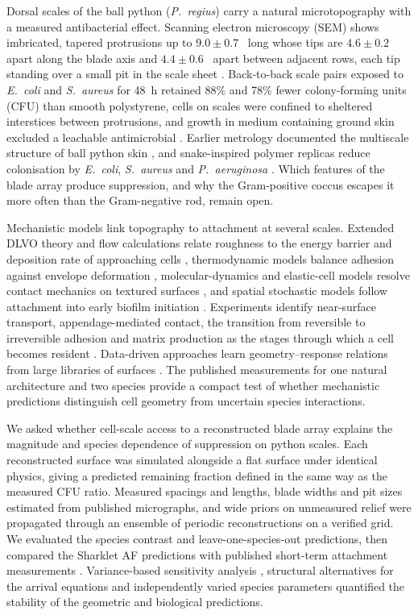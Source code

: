 \documentclass[11pt]{article}
\newcommand{\Ec}{\textit{E.~coli}}
\newcommand{\Sa}{\textit{S.~aureus}}
\newcommand{\Pa}{\textit{P.~aeruginosa}}
\newcommand{\Preg}{\textit{P.~regius}}
\begin{document}
Dorsal scales of the ball python (\Preg{}) carry a natural microtopography with a measured antibacterial effect. Scanning electron microscopy (SEM) shows imbricated, tapered protrusions up to $9.0\pm0.7$~\si{\micrometre} long whose tips are $4.6\pm0.2$~\si{\micrometre} apart along the blade axis and $4.4\pm0.6$~\si{\micrometre} apart between adjacent rows, each tip standing over a small pit in the scale sheet \cite{Peroutka2026}. Back-to-back scale pairs exposed to \Ec{} and \Sa{} for 48~h retained 88\% and 78\% fewer colony-forming units (CFU) than smooth polystyrene, cells on scales were confined to sheltered interstices between protrusions, and growth in medium containing ground skin excluded a leachable antimicrobial \cite{Peroutka2026}. Earlier metrology documented the multiscale structure of ball python skin \cite{AbdelAal2010}, and snake-inspired polymer replicas reduce colonisation by \Ec{}, \Sa{} and \Pa{} \cite{Sulochana2022}. Which features of the blade array produce suppression, and why the Gram-positive coccus escapes it more often than the Gram-negative rod, remain open.

Mechanistic models link topography to attachment at several scales. Extended DLVO theory and flow calculations relate roughness to the energy barrier and deposition rate of approaching cells \cite{Ammar2015,Hermansson1999,Bos1999}, thermodynamic models balance adhesion against envelope deformation \cite{Li2016}, molecular-dynamics and elastic-cell models resolve contact mechanics on textured surfaces \cite{Lazzini2021,Bellanato2026}, and spatial stochastic models follow attachment into early biofilm initiation \cite{Chathoth2022}. Experiments identify near-surface transport, appendage-mediated contact, the transition from reversible to irreversible adhesion and matrix production as the stages through which a cell becomes resident \cite{Zheng2021,An1998,Berne2018,Hoffman2015,Carniello2018,Dufrene2020,Jenal2017,Flemming2016,DiMartino2018,Hou2018}. Data-driven approaches learn geometry--response relations from large libraries of surfaces \cite{Tang2024,Romero2025,LeFevre2025}. The published measurements for one natural architecture and two species provide a compact test of whether mechanistic predictions distinguish cell geometry from uncertain species interactions.

We asked whether cell-scale access to a reconstructed blade array explains the magnitude and species dependence of suppression on python scales. Each reconstructed surface was simulated alongside a flat surface under identical physics, giving a predicted remaining fraction defined in the same way as the measured CFU ratio. Measured spacings and lengths, blade widths and pit sizes estimated from published micrographs, and wide priors on unmeasured relief were propagated through an ensemble of periodic reconstructions on a verified grid. We evaluated the species contrast and leave-one-species-out predictions, then compared the Sharklet AF predictions with published short-term attachment measurements \cite{May2014,Xu2017}. Variance-based sensitivity analysis \cite{Saltelli2010}, structural alternatives for the arrival equations and independently varied species parameters quantified the stability of the geometric and biological predictions.
\end{document}
